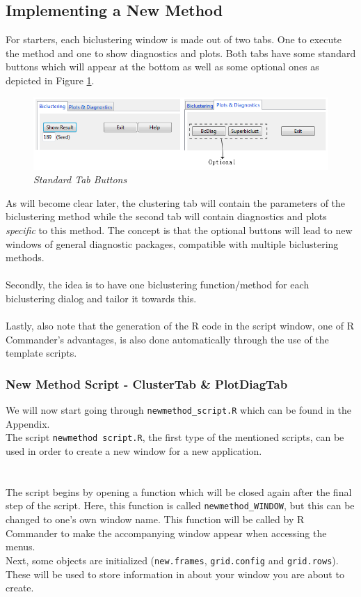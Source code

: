 \documentclass[a4paper]{article}\usepackage[]{graphicx}\usepackage[]{color}
\begin{document}
 



\subsection{Implementing a New Method}

\noindent For starters, each biclustering window is made out of two tabs.
One to execute the method and one to show diagnostics and plots. Both tabs have
some standard buttons which will appear at the bottom as well as some optional
ones as depicted in Figure \ref{stdbuttons}.
\begin{figure}[H]
\centering
\includegraphics[scale=0.5]{figures/standard_buttons.png}
\caption{{\it Standard Tab Buttons}\label{stdbuttons}}
\end{figure}
\noindent As will become clear later, the clustering tab will
contain the parameters of the biclustering method while the second tab will
contain diagnostics and plots {\it specific} to this method. The concept is that
the optional buttons will lead to new windows of general diagnostic packages,
compatible with multiple biclustering methods.
\\ \\
\noindent Secondly, the idea is to have one biclustering function/method for
each biclustering dialog and tailor it towards this. 
\\ \\
\noindent Lastly, also note that the generation of the R code in the script window, one
of R Commander's advantages, is also done automatically through the use of
the template scripts.


\subsubsection{New Method Script - ClusterTab \& PlotDiagTab}
\label{sec:newmethodscript}
We will now start going through \verb|newmethod_script.R| which can be found in
the Appendix.\\
The script \verb|newmethod script.R|, the first type of the mentioned scripts,
can be used in order to create a new window for a new application.
\\ \\
\\
\noindent The script begins by opening a function which will be closed again
after the final step of the script. Here, this function is called \verb|newmethod_WINDOW|,
but this can be changed to one's own window name. This function will be called
by R Commander to make the accompanying window appear when accessing
the menus.\\
Next, some objects are initialized (\verb|new.frames|, \verb|grid.config| and
\verb|grid.rows|). These will be used to store information in about your window
you are about to create.
\end{document}

